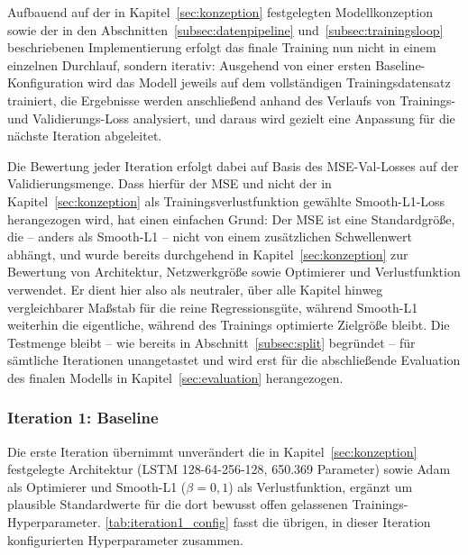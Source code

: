Aufbauend auf der in Kapitel~\ref{sec:konzeption} festgelegten Modellkonzeption sowie der in den Abschnitten~\ref{subsec:datenpipeline} und~\ref{subsec:trainingsloop} beschriebenen Implementierung erfolgt das finale Training nun nicht in einem einzelnen Durchlauf, sondern iterativ: Ausgehend von einer ersten Baseline-Konfiguration wird das Modell jeweils auf dem vollständigen Trainingsdatensatz trainiert, die Ergebnisse werden anschließend anhand des Verlaufs von Trainings- und Validierungs-Loss analysiert, und daraus wird gezielt eine Anpassung für die nächste Iteration abgeleitet.

Die Bewertung jeder Iteration erfolgt dabei auf Basis des \gls{MSE}-Val-Losses auf der Validierungsmenge. Dass hierfür der \gls{MSE} und nicht der in Kapitel~\ref{sec:konzeption} als Trainingsverlustfunktion gewählte Smooth-L1-Loss herangezogen wird, hat einen einfachen Grund: Der \gls{MSE} ist eine Standardgröße, die -- anders als Smooth-L1 -- nicht von einem zusätzlichen Schwellenwert abhängt, und wurde bereits durchgehend in Kapitel~\ref{sec:konzeption} zur Bewertung von Architektur, Netzwerkgröße sowie Optimierer und Verlustfunktion verwendet. Er dient hier also als neutraler, über alle Kapitel hinweg vergleichbarer Maßstab für die reine Regressionsgüte, während Smooth-L1 weiterhin die eigentliche, während des Trainings optimierte Zielgröße bleibt. Die Testmenge bleibt -- wie bereits in Abschnitt~\ref{subsec:split} begründet -- für sämtliche Iterationen unangetastet und wird erst für die abschließende Evaluation des finalen Modells in Kapitel~\ref{sec:evaluation} herangezogen.

\subsubsection{Iteration 1: Baseline}
\label{subsubsec:iteration1}

Die erste Iteration übernimmt unverändert die in Kapitel~\ref{sec:konzeption} festgelegte Architektur (\gls{LSTM} 128-64-256-128, 650.369 Parameter) sowie \gls{Adam} als Optimierer und Smooth-L1 ($\beta = 0{,}1$) als Verlustfunktion, ergänzt um plausible Standardwerte für die dort bewusst offen gelassenen Trainings-Hyperparameter. \autoref{tab:iteration1_config} fasst die übrigen, in dieser Iteration konfigurierten Hyperparameter zusammen.


